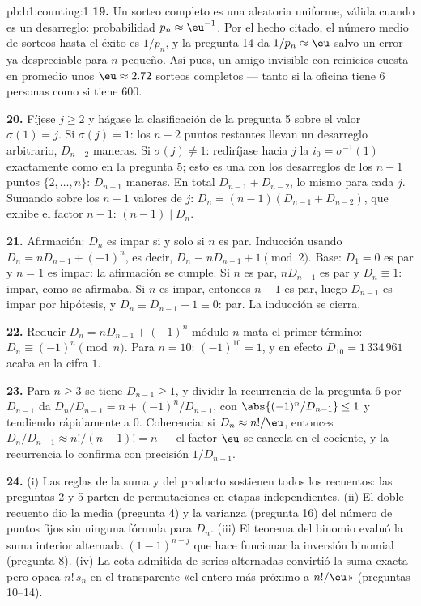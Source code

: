 \begin{solution}{pb:b1:counting:1}
\textbf{19.} Un sorteo completo es una  aleatoria uniforme,
válida cuando es un desarreglo: probabilidad $p_n \approx \eu^{-1}$. Por
el hecho citado, el número medio de sorteos hasta el éxito es $1/p_n$, y
la pregunta 14 da $1/p_n \approx \eu$ salvo un error ya despreciable
para $n$ pequeño. Así pues, un amigo invisible con reinicios cuesta en
promedio unos $\eu \approx 2.72$ sorteos completos --- tanto si la
oficina tiene $6$ personas como si tiene $600$.

\textbf{20.} Fíjese $j \geq 2$ y hágase la clasificación de la
pregunta 5 sobre el valor $\sigma(1) = j$. Si $\sigma(j) = 1$: los
$n - 2$ puntos restantes llevan un desarreglo arbitrario, $D_{n-2}$
maneras. Si $\sigma(j) \neq 1$: rediríjase hacia $j$ la
 $i_0 = \sigma^{-1}(1)$ exactamente como en la
pregunta 5; esto es una  con los desarreglos de los $n - 1$
puntos $\{2, \dots, n\}$: $D_{n-1}$ maneras. En total
$D_{n-1} + D_{n-2}$, lo mismo para cada $j$. Sumando sobre los $n - 1$
valores de $j$: $D_n = (n-1)(D_{n-1} + D_{n-2})$, que exhibe el factor
$n - 1$: $(n-1) \mid D_n$.

\textbf{21.} Afirmación: $D_n$ es impar si y solo si $n$ es par.
Inducción usando $D_n = nD_{n-1} + (-1)^n$, es decir,
$D_n \equiv nD_{n-1} + 1 \pmod 2$. Base: $D_1 = 0$ es par y $n = 1$ es
impar: la afirmación se cumple. Si $n$ es par, $nD_{n-1}$ es par y
$D_n \equiv 1$: impar, como se afirmaba. Si $n$ es impar, entonces
$n - 1$ es par, luego $D_{n-1}$ es impar por hipótesis, y
$D_n \equiv D_{n-1} + 1 \equiv 0$: par. La inducción se cierra.

\textbf{22.} Reducir $D_n = nD_{n-1} + (-1)^n$ módulo $n$ mata el primer
término: $D_n \equiv (-1)^n \pmod n$. Para $n = 10$: $(-1)^{10} = 1$, y
en efecto $D_{10} = 1\,334\,961$ acaba en la cifra $1$.

\textbf{23.} Para $n \geq 3$ se tiene $D_{n-1} \geq 1$, y dividir la
recurrencia de la pregunta 6 por $D_{n-1}$ da
$D_n/D_{n-1} = n + (-1)^n/D_{n-1}$, con $\abs{(-1)^n/D_{n-1}} \leq 1$ y
tendiendo rápidamente a $0$. Coherencia: si $D_n \approx n!/\eu$,
entonces $D_n/D_{n-1} \approx n!/(n-1)! = n$ --- el factor $\eu$ se
cancela en el cociente, y la recurrencia lo confirma con precisión
$1/D_{n-1}$.

\textbf{24.} (i) Las reglas de la suma y del producto sostienen todos los
recuentos: las preguntas 2 y 5 parten  de permutaciones en
etapas independientes. (ii) El doble recuento dio la media (pregunta 4)
y la varianza (pregunta 16) del número de puntos fijos sin ninguna
fórmula para $D_n$. (iii) El teorema del binomio evaluó la suma interior
alternada $(1-1)^{n-j}$ que hace funcionar la inversión binomial
(pregunta 8). (iv) La cota admitida de series alternadas convirtió la
suma exacta pero opaca $n!\,s_n$ en el  transparente «el entero
más próximo a $n!/\eu$» (preguntas 10--14).


\end{solution}

